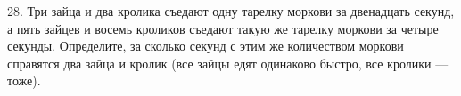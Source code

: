 28. Три зайца и два кролика съедают одну тарелку моркови за двенадцать секунд, а пять зайцев и восемь кроликов съедают такую же тарелку моркови за четыре секунды. Определите, за сколько секунд с этим же количеством моркови справятся два зайца и кролик (все зайцы едят одинаково быстро, все кролики --- тоже).\\
